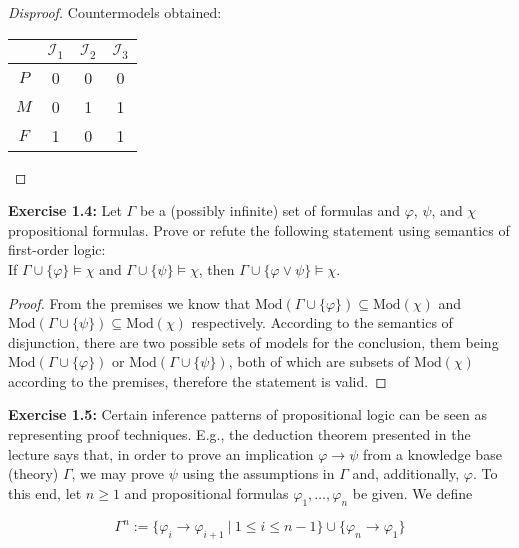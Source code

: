 \documentclass[11pt,a4paper]{article}
\theoremstyle{remark}
\newcommand{\entails}{\models}
\newcommand{\exercise}[1]{{\bfseries{Exercise #1:}}}
\begin{document}
\begin{enumerate}[label=(\alph*)]
{\begin{proof}[Disproof]
    Countermodels obtained:
    
    \begin{center}
    \begin{tabular}{|c|ccc|}
   		 \hline
         &$\mathcal{I}_1$&$\mathcal{I}_2$&$\mathcal{I}_3$\\
         \hline
    	$P$&0&0&0\\
        $M$&0&1&1\\
        $F$&1&0&1\\
        \hline
    \end{tabular}
    \end{center}
    \end{proof}
    }
\end{enumerate}

\exercise{1.4} Let $\Gamma$ be a (possibly infinite) set of formulas and $\varphi$, $\psi$, and $\chi$ propositional formulas. Prove or refute the following statement using semantics of first-order logic:\\

If $\Gamma \cup \{ \varphi \} \entails \chi$ and $\Gamma \cup \{ \psi \} \entails \chi$, then $\Gamma \cup \{ \varphi \vee \psi \} \entails \chi$.

\begin{proof}

From the premises we know that $\mathrm{Mod}(\Gamma \cup \{ \varphi \}) \subseteq \mathrm{Mod}(\chi)$ and $\mathrm{Mod}(\Gamma \cup \{ \psi \}) \subseteq \mathrm{Mod}(\chi)$ respectively. According to the semantics of disjunction, there are two possible sets of models for the conclusion, them being $\mathrm{Mod}(\Gamma \cup \{ \varphi \})$ or $\mathrm{Mod}(\Gamma \cup \{ \psi \})$, both of which are subsets of $\mathrm{Mod}(\chi)$ according to the premises, therefore the statement is valid.

\end{proof}
 
\exercise{1.5} Certain inference patterns of propositional logic can be seen as representing
proof techniques. E.g., the deduction theorem presented in the lecture says that, in order to
prove an implication $\varphi \to \psi$ from a knowledge base (theory) $\Gamma$, we may prove $\psi$ using the
assumptions in $\Gamma$ and, additionally, $\varphi$.
To this end, let $n \geq 1$ and propositional formulas $\varphi_1, \ldots, \varphi_n$ be given. We define

$$\Gamma^n := \{\varphi_i \to \varphi_{i+1} \ | \ 1 \leq i \leq n - 1 \} \cup \{ \varphi_n \to \varphi_1 \}$$
\end{document}
